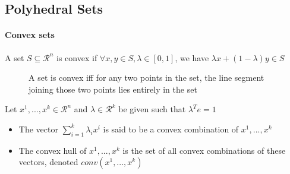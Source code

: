             \subsection{Polyhedral Sets}
                \paragraph{Convex sets}
                    A set $S\subseteq \mathcal{R}^n$ is convex if $\forall x,y \in S, \lambda \in [0,1]$, we have $\lambda x + (1-\lambda)y \in S$

                    \begin{figure}[!htp]
                        \centering
                        \caption{A set is convex iff for any two points in the set, the line segment joining those two points lies entirely in the set}
                    \end{figure}

                    Let $x^1, ..., x^k \in \mathcal{R}^n$ and $\lambda \in \mathcal{R}^k$ be given such that $\lambda^Te=1$
                    \begin{itemize}
                        \item The vector $\sum_{i=1}^k \lambda_i x ^i$ is said to be a convex combination of $x^1, ... , x^k$
                        \item The convex hull of $x^1, ... , x^k$ is the set of all convex combinations of these vectors, denoted $conv(x^1, ... ,x^k)$
                    \end{itemize}

